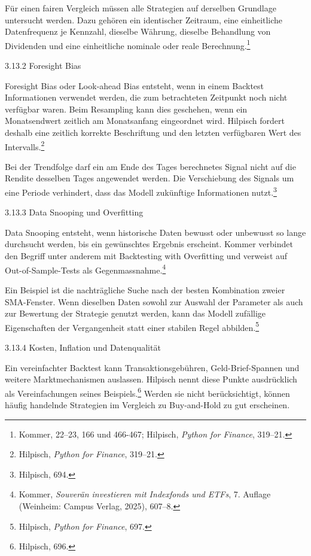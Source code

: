\documentclass[
  ngerman,
  a4paper,
  DIV=11,
  oneside]{scrreprt}
\begin{document}
Für einen fairen Vergleich müssen alle Strategien auf derselben
Grundlage untersucht werden. Dazu gehören ein identischer Zeitraum, eine
einheitliche Datenfrequenz je Kennzahl, dieselbe Währung, dieselbe
Behandlung von Dividenden und eine einheitliche nominale oder reale
Berechnung.\footnote{Kommer, 22--23, 166 und 466-467; Hilpisch,
  \emph{Python for Finance}, 319--21.}

3.13.2 Foresight Bias

Foresight Bias oder Look-ahead Bias entsteht, wenn in einem Backtest
Informationen verwendet werden, die zum betrachteten Zeitpunkt noch
nicht verfügbar waren. Beim Resampling kann dies geschehen, wenn ein
Monatsendwert zeitlich am Monatsanfang eingeordnet wird. Hilpisch
fordert deshalb eine zeitlich korrekte Beschriftung und den letzten
verfügbaren Wert des Intervalls.\footnote{Hilpisch, \emph{Python for
  Finance}, 319--21.}

Bei der Trendfolge darf ein am Ende des Tages berechnetes Signal nicht
auf die Rendite desselben Tages angewendet werden. Die Verschiebung des
Signals um eine Periode verhindert, dass das Modell zukünftige
Informationen nutzt.\footnote{Hilpisch, 694.}

3.13.3 Data Snooping und Overfitting

Data Snooping entsteht, wenn historische Daten bewusst oder unbewusst so
lange durchsucht werden, bis ein gewünschtes Ergebnis erscheint. Kommer
verbindet den Begriff unter anderem mit Backtesting with Overfitting und
verweist auf Out-of-Sample-Tests als Gegenmassnahme.\footnote{Kommer,
  \emph{Souverän investieren mit Indexfonds und ETFs}, 7. Auflage
  (Weinheim: Campus Verlag, 2025), 607--8.}

Ein Beispiel ist die nachträgliche Suche nach der besten Kombination
zweier SMA-Fenster. Wenn dieselben Daten sowohl zur Auswahl der
Parameter als auch zur Bewertung der Strategie genutzt werden, kann das
Modell zufällige Eigenschaften der Vergangenheit statt einer stabilen
Regel abbilden.\footnote{Hilpisch, \emph{Python for Finance}, 697.}

3.13.4 Kosten, Inflation und Datenqualität

Ein vereinfachter Backtest kann Transaktionsgebühren, Geld-Brief-Spannen
und weitere Marktmechanismen auslassen. Hilpisch nennt diese Punkte
ausdrücklich als Vereinfachungen seines Beispiels.\footnote{Hilpisch,
  696.} Werden sie nicht berücksichtigt, können häufig handelnde
Strategien im Vergleich zu Buy-and-Hold zu gut erscheinen.
\end{document}
